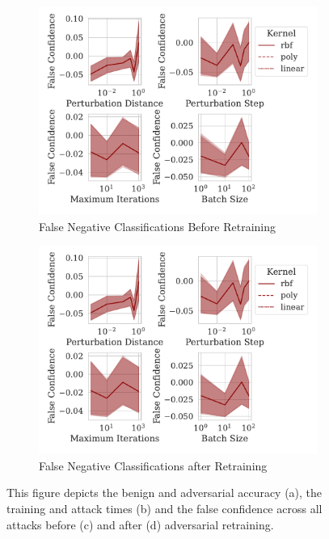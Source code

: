 \documentclass[fonts]{icst}
\begin{document}
\begin{figure}
\begin{subfigure}[b]{0.45\textwidth}
         \label{fig:retrain_time}
     \end{subfigure}
     \hfill
     \begin{subfigure}[b]{0.45\textwidth}
         \centering
         \includegraphics[width=\textwidth]{./generated/confidence_vs_attack_parameters.pdf}
         \caption{False Negative Classifications Before Retraining}
        \label{fig:before_retrain}
     \end{subfigure}
     \hfill
     \begin{subfigure}[b]{0.45\textwidth}
         \centering
         \includegraphics[width=\textwidth]{./generated/retrain_confidence_vs_attack_parameters.pdf}
         \caption{False Negative Classifications after Retraining}
        \label{fig:after_retrain}
     \end{subfigure}
     \hfill
     \label{fig:retratin}
     \caption{This figure depicts the benign and adversarial accuracy (a), the training and attack times (b) and the false confidence across all attacks before (c) and after (d) adversarial retraining.}
\end{figure}
\end{document}
